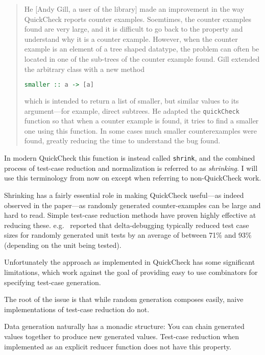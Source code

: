 \begin{quote}
He [Andy Gill, a user of the library] made an improvement in the way QuickCheck reports counter examples.
Soemtimes, the counter examples found are very large,
and it is difficult to go back to the property and understand why it is a counter example.
However,
when the counter example is an element of a tree shaped datatype,
the problem can often be located in one of the sub-trees of the counter example found.
Gill extended the arbitrary class with a new method

\begin{lstlisting}[language=Haskell]
smaller :: a -> [a]
\end{lstlisting}

which is intended to return a list of smaller, but similar values to its argument---for example, direct subtrees.
He adapted the \texttt{quickCheck} function so that when a counter example is found,
it tries to find a smaller one using this function.
In some cases much smaller counterexamples were found,
greatly reducing the time to understand the bug found.
\end{quote}

In modern QuickCheck this function is instead called \texttt{shrink},
and the combined process of test-case reduction and normalization is referred to as \emph{shrinking}.
I will use this terminology from now on except when referring to non-QuickCheck work.

Shrinking has a fairly essential role in making QuickCheck useful---as indeed observed in the paper---as randomly generated counter-examples can be large and hard to read.
Simple test-case reduction methods have proven highly effective at reducing these.
e.g.~ \cite{DBLP:conf/issre/LeiA05} reported that delta-debugging typically reduced test case sizes for randomly generated unit tests by an average of between 71\% and 93\% (depending on the unit being tested). 

Unfortunately the approach as implemented in QuickCheck has some significant limitations,
which work against the goal of providing easy to use combinators for specifying test-case generation.

The root of the issue is that while random generation composes easily,
naive implementations of test-case reduction do not.

Data generation naturally has a monadic structure:
You can chain generated values together to produce new generated values.
Test-case reduction when implemented as an explicit reducer function does not have this property.


